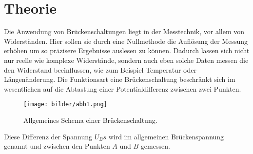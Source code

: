 \section{Theorie}
Die Anwendung von Brückenschaltungen liegt in der Messtechnik,  vor allem von Widerständen. 
Hier sollen sie durch eine Nullmethode die Auflösung der Messung erhöhen um so präzisere Ergebnisse
auslesen zu können. Dadurch lassen sich nicht nur reelle wie komplexe Widerstände, sondern auch eben 
solche Daten messen die den Widerstand beeinflussen, wie zum Beispiel Temperatur oder Längenänderung. %
Die Funktionsart eine Brückenschaltung beschränkt sich im wesentlichen auf die Abtastung einer 
Potentialdifferenz zwischen zwei Punkten. 
\begin{figure}
    \centering
    \texttt{[image: bilder/abb1.png]}
    \caption{Allgemeines Schema einer Brückenschaltung. \cite{skript}} 
    \label{fig:abb1}
\end{figure}
Diese Differenz der Spannung $U_Bs$ wird im allgemeinen Brückenspannung genannt und zwischen den Punkten $A$ und $B$ gemessen.
\\
\newline



